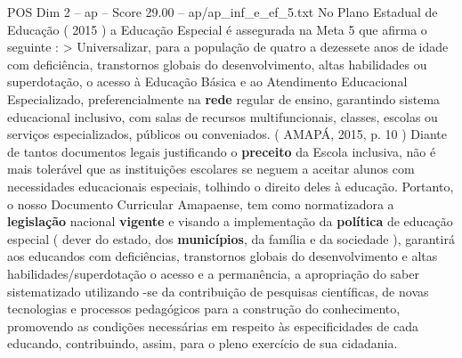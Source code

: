 \begin{textsample}{POS Dim 2 – ap – Score 29.00 – ap/ap\_inf\_e\_ef\_5.txt}
No Plano Estadual de Educação ( 2015 ) a Educação Especial é assegurada na Meta 5 que afirma o seguinte : > Universalizar, para a população de quatro a dezessete anos de idade com deficiência, transtornos globais do desenvolvimento, altas habilidades ou superdotação, o acesso à Educação Básica e ao Atendimento Educacional Especializado, preferencialmente na \textbf{rede} regular de ensino, garantindo sistema educacional inclusivo, com salas de recursos multifuncionais, classes, escolas ou serviços especializados, públicos ou conveniados. ( AMAPÁ, 2015, p. 10 ) Diante de tantos documentos legais justificando o \textbf{preceito} da Escola inclusiva, não é mais tolerável que as instituições escolares se neguem a aceitar alunos com necessidades educacionais especiais, tolhindo o direito deles à educação.
Portanto, o nosso Documento Curricular Amapaense, tem como normatizadora a \textbf{legislação} nacional \textbf{vigente} e visando a implementação da \textbf{política} de educação especial ( dever do estado, dos \textbf{municípios}, da família e da sociedade ), garantirá aos educandos com deficiências, transtornos globais do desenvolvimento e altas habilidades/superdotação o acesso e a permanência, a apropriação do saber sistematizado utilizando -se da contribuição de pesquisas científicas, de novas tecnologias e processos pedagógicos para a construção do conhecimento, promovendo as condições necessárias em respeito às especificidades de cada educando, contribuindo, assim, para o pleno exercício de sua cidadania.

\end{textsample}
